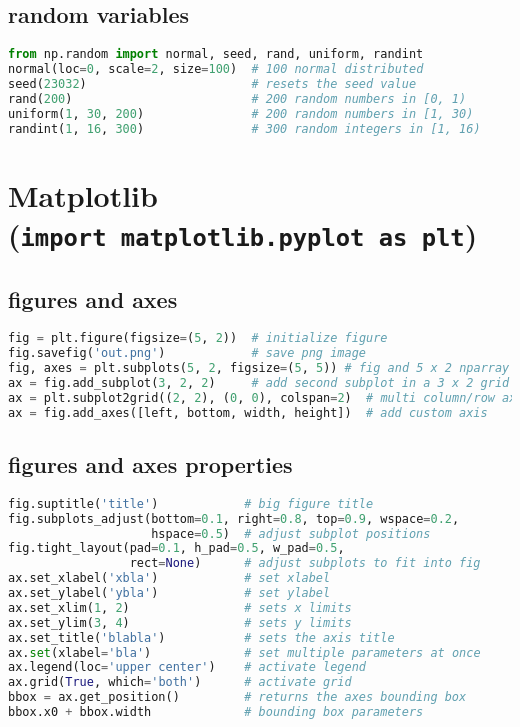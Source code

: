 \subsection{random variables}\label{random-variables}

\begin{lstlisting}[language=Python]
from np.random import normal, seed, rand, uniform, randint
normal(loc=0, scale=2, size=100)  # 100 normal distributed
seed(23032)                       # resets the seed value
rand(200)                         # 200 random numbers in [0, 1)
uniform(1, 30, 200)               # 200 random numbers in [1, 30)
randint(1, 16, 300)               # 300 random integers in [1, 16)
\end{lstlisting}

\section{\texorpdfstring{Matplotlib
(\texttt{import\ matplotlib.pyplot\ as\ plt})}{Matplotlib (import matplotlib.pyplot as plt)}}\label{matplotlib-import-matplotlib.pyplot-as-plt}

\subsection{figures and axes}\label{figures-and-axes}

\begin{lstlisting}[language=Python]
fig = plt.figure(figsize=(5, 2))  # initialize figure
fig.savefig('out.png')            # save png image
fig, axes = plt.subplots(5, 2, figsize=(5, 5)) # fig and 5 x 2 nparray of axes
ax = fig.add_subplot(3, 2, 2)     # add second subplot in a 3 x 2 grid
ax = plt.subplot2grid((2, 2), (0, 0), colspan=2)  # multi column/row axis
ax = fig.add_axes([left, bottom, width, height])  # add custom axis
\end{lstlisting}

\subsection{figures and axes
properties}\label{figures-and-axes-properties}

\begin{lstlisting}[language=Python]
fig.suptitle('title')            # big figure title
fig.subplots_adjust(bottom=0.1, right=0.8, top=0.9, wspace=0.2,
                    hspace=0.5)  # adjust subplot positions
fig.tight_layout(pad=0.1, h_pad=0.5, w_pad=0.5,
                 rect=None)      # adjust subplots to fit into fig
ax.set_xlabel('xbla')            # set xlabel
ax.set_ylabel('ybla')            # set ylabel
ax.set_xlim(1, 2)                # sets x limits
ax.set_ylim(3, 4)                # sets y limits
ax.set_title('blabla')           # sets the axis title
ax.set(xlabel='bla')             # set multiple parameters at once
ax.legend(loc='upper center')    # activate legend
ax.grid(True, which='both')      # activate grid
bbox = ax.get_position()         # returns the axes bounding box
bbox.x0 + bbox.width             # bounding box parameters
\end{lstlisting}

